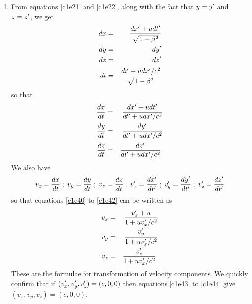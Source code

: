 \begin{enumerate}
\item From equations \eqref{c1e21} and \eqref{c1e22}, along with the fact that
$y = y^\prime$ and $z = z^\prime$, we get
\begin{eqnarray}
dx &=& \frac{dx^\prime + udt^\prime}{\sqrt{1 - \beta^2}} \label{c1e36} \\
dy &=& dy^\prime \label{c1e37} \\
dz &=& dz^\prime \label{c1e38} \\
dt &=& \frac{dt^\prime + udx^\prime/c^2}{\sqrt{1 - \beta^2}} \label{c1e39}
\end{eqnarray}
so that
\begin{eqnarray}
\frac{dx}{dt} &=& \frac{dx^\prime + udt^\prime}{dt^\prime + udx^\prime/c^2} \label{c1e40} \\
\frac{dy}{dt} &=& \frac{dy^\prime}{dt^\prime + udx^\prime/c^2} \label{c1e41} \\
\frac{dz}{dt} &=& \frac{dz^\prime}{dt^\prime + udx^\prime/c^2}. \label{c1e42}
\end{eqnarray}
We also have
\[
v_x = \frac{dx}{dt}\;;\;v_y = \frac{dy}{dt}\;;\;v_z = \frac{dz}{dt}\;;\;
v_x^\prime = \frac{dx^\prime}{dt^\prime}\;;\;v_y^\prime = \frac{dy^\prime}{dt^\prime}
\;;\;v_z^\prime = \frac{dz^\prime}{dt^\prime}
\]
so that equations \eqref{c1e40} to \eqref{c1e42} can be written as
\begin{eqnarray}
v_x &=& \frac{v_x^\prime + u}{1 + uv_x^\prime/c^2} \label{c1e43} \\
v_y &=& \frac{v_y^\prime}{1 + uv_x^\prime/c^2} \label{c1e44} \\
v_z &=& \frac{v_z^\prime}{1 + uv_x^\prime/c^2}. \label{c1e45} 
\end{eqnarray}
These are the formulae for transformation of velocity components. We
quickly confirm that if $(v_x^\prime, v_y^\prime, v_z^\prime) = (c, 0, 0)$ then
equations \eqref{c1e43} to \eqref{c1e44} give $(v_x, v_y, v_z) = (c, 0, 0)$.


\end{enumerate}

